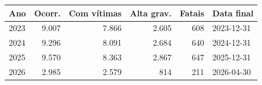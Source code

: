 \begin{tabular}{@{}lrrrrl@{}}
\toprule
\textbf{Ano} & \textbf{Ocorr.} & \textbf{Com v\'itimas} & \textbf{Alta grav.} & \textbf{Fatais} & \textbf{Data final} \\
\midrule
2023 & 9.007 & 7.866 & 2.605 & 608 & 2023-12-31 \\
2024 & 9.296 & 8.091 & 2.684 & 640 & 2024-12-31 \\
2025 & 9.570 & 8.363 & 2.867 & 647 & 2025-12-31 \\
2026 & 2.985 & 2.579 & 814 & 211 & 2026-04-30 \\
\bottomrule
\end{tabular}